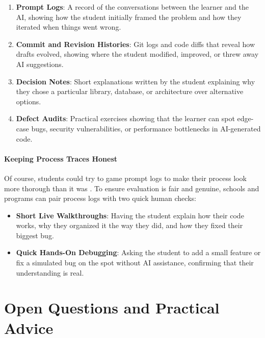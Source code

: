 \documentclass[11pt]{article}
\begin{document}
\begin{enumerate}
\item \textbf{Prompt Logs}: A record of the conversations between the learner and the AI, showing how the student initially framed the problem and how they iterated when things went wrong.
\item \textbf{Commit and Revision Histories}: Git logs and code diffs that reveal how drafts evolved, showing where the student modified, improved, or threw away AI suggestions.
\item \textbf{Decision Notes}: Short explanations written by the student explaining why they chose a particular library, database, or architecture over alternative options.
\item \textbf{Defect Audits}: Practical exercises showing that the learner can spot edge-case bugs, security vulnerabilities, or performance bottlenecks in AI-generated code.
\end{enumerate}

\paragraph{Keeping Process Traces Honest}
Of course, students could try to game prompt logs to make their process look more thorough than it was \citep{zheng2024}. To ensure evaluation is fair and genuine, schools and programs can pair process logs with two quick human checks:
\begin{itemize}
\item \textbf{Short Live Walkthroughs}: Having the student explain how their code works, why they organized it the way they did, and how they fixed their biggest bug.
\item \textbf{Quick Hands-On Debugging}: Asking the student to add a small feature or fix a simulated bug on the spot without AI assistance, confirming that their understanding is real.
\end{itemize}

\section{Open Questions and Practical Advice}
\end{document}
